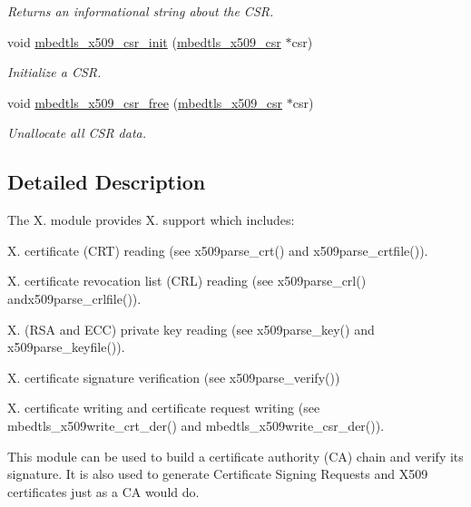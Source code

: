 \begin{DoxyCompactItemize}
\begin{DoxyCompactList}\small\item\em Returns an informational string about the C\-S\-R. \end{DoxyCompactList}\item 
void \hyperlink{group__x509__module_ga984db025f6953ea61be7dfca2d928f37}{mbedtls\-\_\-x509\-\_\-csr\-\_\-init} (\hyperlink{structmbedtls__x509__csr}{mbedtls\-\_\-x509\-\_\-csr} $\ast$csr)
\begin{DoxyCompactList}\small\item\em Initialize a C\-S\-R. \end{DoxyCompactList}\item 
void \hyperlink{group__x509__module_gac2139becff64aa7294ecad4f40767a84}{mbedtls\-\_\-x509\-\_\-csr\-\_\-free} (\hyperlink{structmbedtls__x509__csr}{mbedtls\-\_\-x509\-\_\-csr} $\ast$csr)
\begin{DoxyCompactList}\small\item\em Unallocate all C\-S\-R data. \end{DoxyCompactList}\end{DoxyCompactItemize}


\subsection{Detailed Description}
The X. module provides X. support which includes\-:
\begin{DoxyItemize}
\item X. certificate (C\-R\-T) reading (see {\ttfamily x509parse\-\_\-crt()} and {\ttfamily x509parse\-\_\-crtfile()}).
\item X. certificate revocation list (C\-R\-L) reading (see {\ttfamily x509parse\-\_\-crl()} and{\ttfamily x509parse\-\_\-crlfile()}).
\item X. (R\-S\-A and E\-C\-C) private key reading (see {\ttfamily x509parse\-\_\-key()} and {\ttfamily x509parse\-\_\-keyfile()}).
\item X. certificate signature verification (see {\ttfamily x509parse\-\_\-verify()})
\item X. certificate writing and certificate request writing (see {\ttfamily mbedtls\-\_\-x509write\-\_\-crt\-\_\-der()} and {\ttfamily mbedtls\-\_\-x509write\-\_\-csr\-\_\-der()}).
\end{DoxyItemize}

This module can be used to build a certificate authority (C\-A) chain and verify its signature. It is also used to generate Certificate Signing Requests and X509 certificates just as a C\-A would do. 

